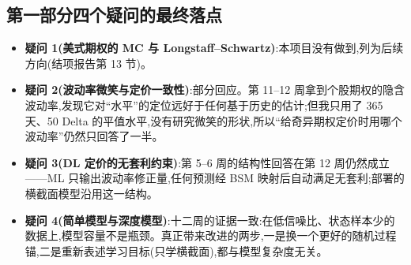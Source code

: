 \documentclass[11pt]{ctexart}
\begin{document}
\subsection{第一部分四个疑问的最终落点}
\begin{itemize}
  \item \textbf{疑问 1(美式期权的 MC 与 Longstaff--Schwartz)}:本项目没有做到,列为后续方向(结项报告第 13 节)。
  \item \textbf{疑问 2(波动率微笑与定价一致性)}:部分回应。第 11--12 周拿到个股期权的隐含波动率,发现它对“水平”的定位远好于任何基于历史的估计;但我只用了 365 天、50 Delta 的平值水平,没有研究微笑的形状,所以“给奇异期权定价时用哪个波动率”仍然只回答了一半。
  \item \textbf{疑问 3(DL 定价的无套利约束)}:第 5--6 周的结构性回答在第 12 周仍然成立——ML 只输出波动率修正量,任何预测经 BSM 映射后自动满足无套利;部署的横截面模型沿用这一结构。
  \item \textbf{疑问 4(简单模型与深度模型)}:十二周的证据一致:在低信噪比、状态样本少的数据上,模型容量不是瓶颈。真正带来改进的两步,一是换一个更好的随机过程锚,二是重新表述学习目标(只学横截面),都与模型复杂度无关。
\end{itemize}
\end{document}
